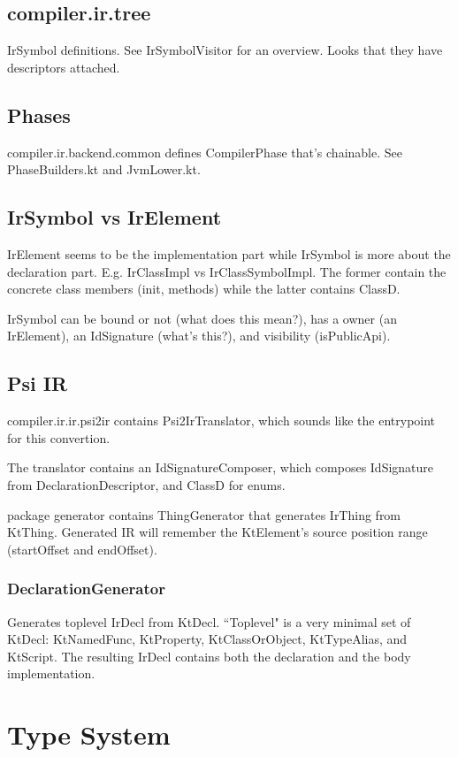 \documentclass{article}
\begin{document}
\subsection{compiler.ir.tree}
IrSymbol definitions. See IrSymbolVisitor for an overview. Looks that they have descriptors attached.

\subsection{Phases}
compiler.ir.backend.common defines CompilerPhase that's chainable. See PhaseBuilders.kt and JvmLower.kt.

\subsection{IrSymbol vs IrElement}
IrElement seems to be the implementation part while IrSymbol is more about the declaration part. E.g. IrClassImpl vs IrClassSymbolImpl. The former contain the concrete class members (init, methods) while the latter contains ClassD.

IrSymbol can be bound or not (what does this mean?), has a owner (an IrElement), an IdSignature (what's this?), and visibility (isPublicApi).

\subsection{Psi \textSafeTo IR}

compiler.ir.ir.psi2ir contains Psi2IrTranslator, which sounds like the entrypoint for this convertion.

The translator contains an IdSignatureComposer, which composes IdSignature from DeclarationDescriptor, and ClassD for enums.

package generator contains ThingGenerator that generates IrThing from KtThing. Generated IR will remember the KtElement's source position range (startOffset and endOffset).

\subsubsection{DeclarationGenerator}

Generates toplevel IrDecl from KtDecl. ``Toplevel" is a very minimal set of KtDecl: KtNamedFunc, KtProperty, KtClassOrObject, KtTypeAlias, and KtScript. The resulting IrDecl contains both the declaration and the body implementation.

\section{Type System}
\end{document}
